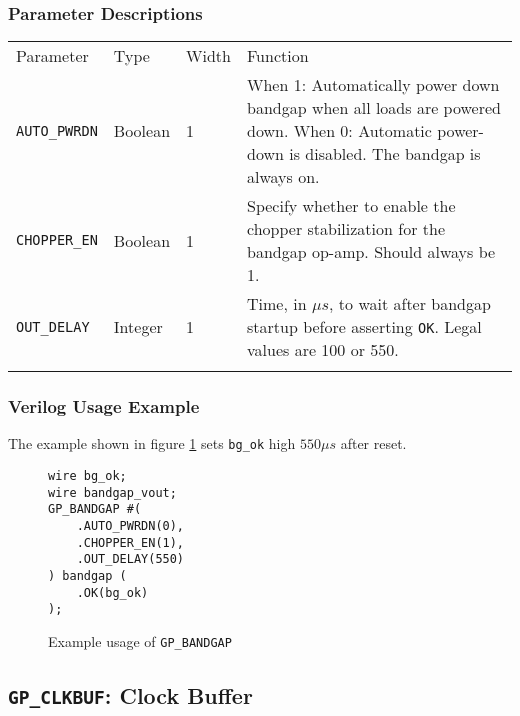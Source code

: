 \documentclass[11pt]{article}
\newcommand{\tokenstyle}[1]{\texttt{#1}}
\newcommand{\wirestyle}[1]{\texttt{#1}}
\newcommand{\whenstyle}[1]{{\fontseries{sb}\selectfont#1}}
\newcommand{\thinhline}{\Xhline{1\arrayrulewidth}}
\newcommand{\thickhline}{\Xhline{2.5\arrayrulewidth}}
\begin{document}
\subsubsection{Parameter Descriptions}

\begin{tabularx}{\textwidth}{lllX}
\thinhline
\whenstyle{Parameter} & \whenstyle{Type} & \whenstyle{Width} & \whenstyle{Function} \\
\thickhline
\tokenstyle{AUTO\_PWRDN} & Boolean & 1 &
	\whenstyle{When 1:} Automatically power down bandgap when all loads are powered down. \newline
	\whenstyle{When 0:} Automatic power-down is disabled. \newline The bandgap is always on.\\
\thinhline
\tokenstyle{CHOPPER\_EN} & Boolean & 1 &
	Specify whether to enable the chopper stabilization for the bandgap op-amp. Should always be 1. \\
\thinhline
\tokenstyle{OUT\_DELAY} & Integer & 1 &
	Time, in $\mu s$, to wait after bandgap startup before asserting \tokenstyle{OK}. Legal values are 100 or 550.\\
\thinhline
\end{tabularx}

\subsubsection{Verilog Usage Example}

The example shown in figure \ref{gp-bandgap-example} sets \wirestyle{bg\_ok} high $550 \mu s$ after reset.

\begin{figure}[h]
\begin{lstlisting}
wire bg_ok;
wire bandgap_vout;
GP_BANDGAP #(
	.AUTO_PWRDN(0),
	.CHOPPER_EN(1),
	.OUT_DELAY(550)
) bandgap (
	.OK(bg_ok)
);
\end{lstlisting}
\caption{Example usage of \tokenstyle{GP\_BANDGAP}}
\label{gp-bandgap-example}
\end{figure}


\pagebreak
\subsection{\tokenstyle{GP\_CLKBUF}: Clock Buffer}
\label{gp-clkbuf}
\end{document}
